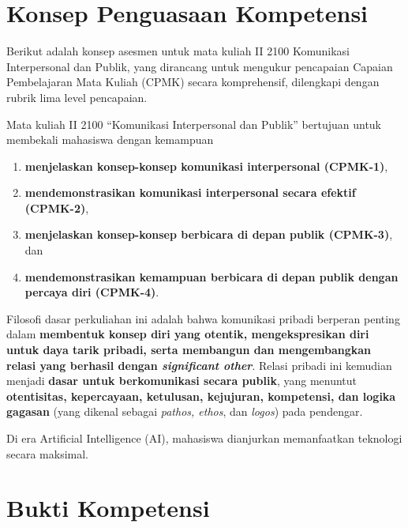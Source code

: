 \documentclass[
  letterpaper,
  DIV=11,
  numbers=noendperiod]{scrreprt}
\begin{document}
\section*{Konsep Penguasaan
Kompetensi}\label{konsep-penguasaan-kompetensi}


Berikut adalah konsep asesmen untuk mata kuliah II 2100 Komunikasi
Interpersonal dan Publik, yang dirancang untuk mengukur pencapaian
Capaian Pembelajaran Mata Kuliah (CPMK) secara komprehensif, dilengkapi
dengan rubrik lima level pencapaian.

Mata kuliah II 2100 ``Komunikasi Interpersonal dan Publik'' bertujuan
untuk membekali mahasiswa dengan kemampuan

\begin{enumerate}
\def\labelenumi{\arabic{enumi}.}
\item
  \textbf{menjelaskan konsep-konsep komunikasi interpersonal (CPMK-1)},
\item
  \textbf{mendemonstrasikan komunikasi interpersonal secara efektif
  (CPMK-2)},
\item
  \textbf{menjelaskan konsep-konsep berbicara di depan publik (CPMK-3)},
  dan
\item
  \textbf{mendemonstrasikan kemampuan berbicara di depan publik dengan
  percaya diri (CPMK-4)}.
\end{enumerate}

Filosofi dasar perkuliahan ini adalah bahwa komunikasi pribadi berperan
penting dalam \textbf{membentuk konsep diri yang otentik,
mengekspresikan diri untuk daya tarik pribadi, serta membangun dan
mengembangkan relasi yang berhasil dengan \emph{significant other}}.
Relasi pribadi ini kemudian menjadi \textbf{dasar untuk berkomunikasi
secara publik}, yang menuntut \textbf{otentisitas, kepercayaan,
ketulusan, kejujuran, kompetensi, dan logika gagasan} (yang dikenal
sebagai \emph{pathos, ethos}, dan \emph{logos}) pada pendengar.

Di era Artificial Intelligence (AI), mahasiswa dianjurkan memanfaatkan
teknologi secara maksimal.

\section*{Bukti Kompetensi}\label{bukti-kompetensi}

\end{document}
